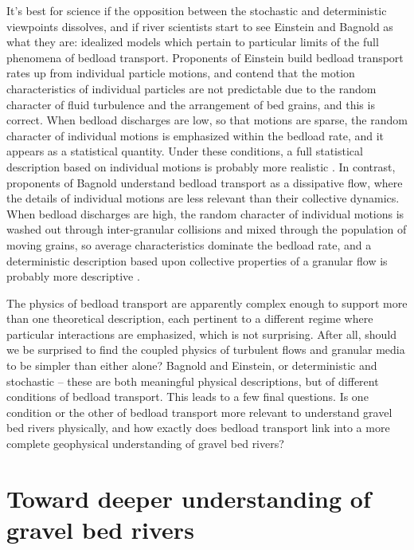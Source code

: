 \documentclass{article}
\begin{document}
It's best for science if the opposition between the stochastic and deterministic viewpoints dissolves, and if river scientists start to see Einstein and Bagnold as what they are: idealized models which pertain to particular limits of the full phenomena of bedload transport. 
Proponents of Einstein build bedload transport rates up from individual particle motions, and contend that the motion characteristics of individual particles are not predictable due to the random character of fluid turbulence and the arrangement of bed grains, and this is correct. 
When bedload discharges are low, so that motions are sparse, the random character of individual motions is emphasized within the bedload rate, and it appears as a statistical quantity.
Under these conditions, a full statistical description based on individual motions is probably more realistic \citep{Ancey2008, Heyman2013, Ma2014, Heyman2016}.
In contrast, proponents of Bagnold understand bedload transport as a dissipative flow, where the details of individual motions are less relevant than their collective dynamics. 
When bedload discharges are high, the random character of individual motions is washed out through inter-granular collisions and mixed through the population of moving grains, so average characteristics dominate the bedload rate, and a deterministic description based upon collective properties of a granular flow is probably more descriptive \citep{Jenkins1998,  Frey2011, Frey2014}.

The physics of bedload transport are apparently complex enough to support more than one theoretical description, each pertinent to a different regime where particular interactions are emphasized, which is not surprising. 
After all, should we be surprised to find the coupled physics of turbulent flows and granular media to be simpler than either alone?
Bagnold and Einstein, or deterministic and stochastic -- these are both meaningful physical descriptions, but of different conditions of bedload transport.
This leads to a few final questions. 
Is one condition or the other of bedload transport more relevant to understand gravel bed rivers physically, and how exactly does bedload transport link into a more complete geophysical understanding of gravel bed rivers?  


\section{Toward deeper understanding of gravel bed rivers} 
\end{document}
